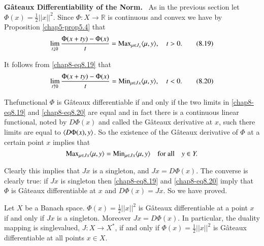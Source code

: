 \noindent
{\bf G\^ateaux Differentiability of the Norm.}~ As in the previous
section let $\Phi(x)=\frac{1}{2}||x||^{2}$. Since $\Phi:X\to
\mathbb{R}$ is continuous and convex we have by Proposition
\ref{chap5-prop5.4} that
\begin{equation*}
\lim\limits_{t\downarrow 0}\frac{\Phi(x+ty)-\Phi(x)}{t}=\operatorname{Max}_{\mu\in
  J_{x}}\langle \mu,y\rangle,\quad t>0.\tag{8.19}\label{chap8-eq8.19} 
\end{equation*}

It follows from \eqref{chap8-eq8.19} that
\begin{equation*}
\lim\limits_{t\uparrow 0}\frac{\Phi(x+ty)-\Phi(x)}{t}=\operatorname{Min}_{\mu\in
  Jx}\langle \mu,y\rangle,\quad t<0.\tag{8.20}\label{chap8-eq8.20} 
\end{equation*}

The\pageoriginale functional $\Phi$ is G\^ateaux differentiable if and
only if the two limits in \eqref{chap8-eq8.19} and
\eqref{chap8-eq8.20} are equal and in fact there is a continuous
linear functional, noted by $D\Phi(x)$ and called the G\^ateaux
derivative at $x$, such there limits are equal to $\langle
D\Phi(x),y\rangle$. So the existence of the G\^ateaux derivative of $\Phi$
at a certain point $x$ implies that
$$
\operatorname{Max}_{\mu\in Jx}\langle \mu,y\rangle=\operatorname{Min}_{\mu\in Jx}\langle \mu,y\rangle\quad\text{for
  all}\quad y\in Y.
$$

Clearly this implies that $Jx$ is a singleton, and $Jx=D\Phi(x)$. The
converse is clearly true: if $Jx$ is singleton then
\eqref{chap8-eq8.19} and \eqref{chap8-eq8.20} imply that $\Phi$ is
G\^ateaux differentiable at $x$ and $D\Phi(x)=Jx$. So we have proved.

\begin{proposition}\label{chap8-prop8.5}
Let $X$ be a Banach space. $\Phi(x)=\frac{1}{2}||x||^{2}$ is G\^ateaux
differentiable at a point $x$ if and only if $Jx$ is a
singleton. Moreover $Jx=D\Phi(x)$. In particular, the duality mapping
is singlevalued, $J:X\to X^{*}$, if and only if
$\Phi(x)=\frac{1}{2}||x||^{2}$ is G\^ateaux differentiable at all
points $x\in X$.
\end{proposition}


